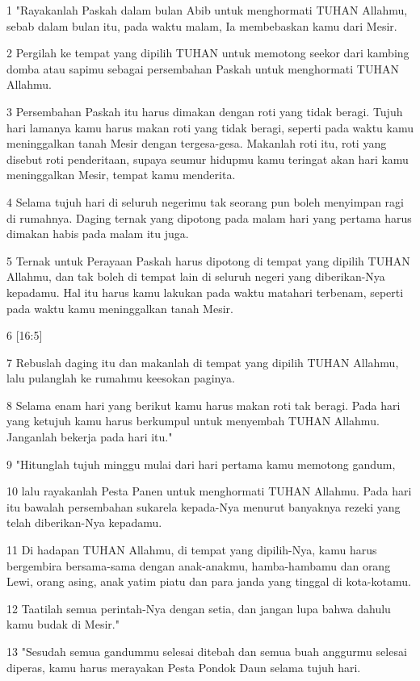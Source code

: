 \par 1 "Rayakanlah Paskah dalam bulan Abib untuk menghormati TUHAN Allahmu, sebab dalam bulan itu, pada waktu malam, Ia membebaskan kamu dari Mesir.
\par 2 Pergilah ke tempat yang dipilih TUHAN untuk memotong seekor dari kambing domba atau sapimu sebagai persembahan Paskah untuk menghormati TUHAN Allahmu.
\par 3 Persembahan Paskah itu harus dimakan dengan roti yang tidak beragi. Tujuh hari lamanya kamu harus makan roti yang tidak beragi, seperti pada waktu kamu meninggalkan tanah Mesir dengan tergesa-gesa. Makanlah roti itu, roti yang disebut roti penderitaan, supaya seumur hidupmu kamu teringat akan hari kamu meninggalkan Mesir, tempat kamu menderita.
\par 4 Selama tujuh hari di seluruh negerimu tak seorang pun boleh menyimpan ragi di rumahnya. Daging ternak yang dipotong pada malam hari yang pertama harus dimakan habis pada malam itu juga.
\par 5 Ternak untuk Perayaan Paskah harus dipotong di tempat yang dipilih TUHAN Allahmu, dan tak boleh di tempat lain di seluruh negeri yang diberikan-Nya kepadamu. Hal itu harus kamu lakukan pada waktu matahari terbenam, seperti pada waktu kamu meninggalkan tanah Mesir.
\par 6 [16:5]
\par 7 Rebuslah daging itu dan makanlah di tempat yang dipilih TUHAN Allahmu, lalu pulanglah ke rumahmu keesokan paginya.
\par 8 Selama enam hari yang berikut kamu harus makan roti tak beragi. Pada hari yang ketujuh kamu harus berkumpul untuk menyembah TUHAN Allahmu. Janganlah bekerja pada hari itu."
\par 9 "Hitunglah tujuh minggu mulai dari hari pertama kamu memotong gandum,
\par 10 lalu rayakanlah Pesta Panen untuk menghormati TUHAN Allahmu. Pada hari itu bawalah persembahan sukarela kepada-Nya menurut banyaknya rezeki yang telah diberikan-Nya kepadamu.
\par 11 Di hadapan TUHAN Allahmu, di tempat yang dipilih-Nya, kamu harus bergembira bersama-sama dengan anak-anakmu, hamba-hambamu dan orang Lewi, orang asing, anak yatim piatu dan para janda yang tinggal di kota-kotamu.
\par 12 Taatilah semua perintah-Nya dengan setia, dan jangan lupa bahwa dahulu kamu budak di Mesir."
\par 13 "Sesudah semua gandummu selesai ditebah dan semua buah anggurmu selesai diperas, kamu harus merayakan Pesta Pondok Daun selama tujuh hari.
